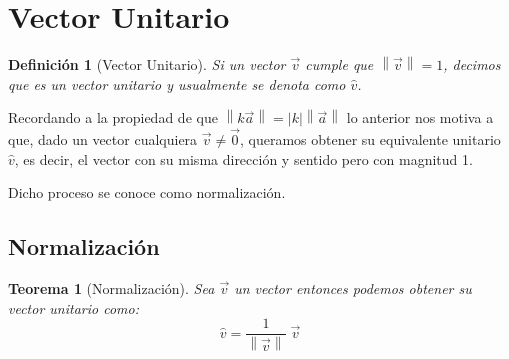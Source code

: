\documentclass[12pt, fleqn]{report}                             %
\newtheorem{Theorem}{Teorema}[section]                          %
\newtheorem{Definition}{Definición}[section]                    %
\theoremstyle{break}                                            %
\newcommand{\abs}[1]{\left\lvert #1 \right\lvert}               %
\newcommand{\Abs}[1]{\left\lVert #1 \right\lVert}               %
\begin{document}
        \clearpage
        \section{Vector Unitario}

            \begin{Definition}[Vector Unitario]
                Si un vector $\vec{v}$ cumple que $\Abs{\vec{v}} = 1$, decimos que es un
                \emph{vector unitario} y usualmente se denota como $\hat{v}$.
            \end{Definition}

            Recordando a la propiedad de que $\Abs{k\vec{a}} = \abs{k} \Abs{\vec{a}}$ lo anterior
            nos motiva a que, dado un vector cualquiera $\vec{v} \neq \vec{0}$, queramos obtener
            su equivalente unitario $\hat{v}$, es decir, el vector con su misma dirección y sentido
            pero con magnitud 1.

            Dicho proceso se conoce como normalización.

            \subsection{Normalización}
                
                \begin{Theorem}[Normalización]
                    Sea $\vec{v}$ un vector entonces podemos obtener su vector unitario como:
                    \begin{equation}
                        \hat{v} = \dfrac{1}{ \Abs{\vec{v}}} \; \vec{v}
                    \end{equation}
                \end{Theorem}
            
\end{document}
